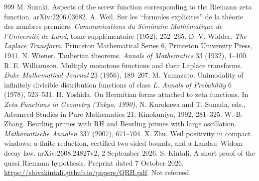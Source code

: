 \begin{thebibliography}{999}
 M. Suzuki. Aspects of the screw function corresponding to the Riemann zeta function. arXiv:2206.03682.
 A. Weil. Sur les ``formules explicites'' de la th\'eorie des nombres premiers. \emph{Communications du S\'eminaire Math\'ematique de l'Universit\'e de Lund}, tome suppl\'ementaire (1952), 252--265.
 D. V. Widder. \emph{The Laplace Transform}. Princeton Mathematical Series 6, Princeton University Press, 1941.
 N. Wiener. Tauberian theorems. \emph{Annals of Mathematics} 33 (1932), 1--100.
 R. E. Williamson. Multiply monotone functions and their Laplace transforms. \emph{Duke Mathematical Journal} 23 (1956), 189--207.
 M. Yamazato. Unimodality of infinitely divisible distribution functions of class $L$. \emph{Annals of Probability} 6 (1978), 523--531.
 H. Yoshida. On Hermitian forms attached to zeta functions. In \emph{Zeta Functions in Geometry (Tokyo, 1990)}, N. Kurokawa and T. Sunada, eds., Advanced Studies in Pure Mathematics 21, Kinokuniya, 1992, 281--325.
 W.-B. Zhang. Beurling primes with RH and Beurling primes with large oscillation. \emph{Mathematische Annalen} 337 (2007), 671--704.
 X. Zhu. Weil positivity in compact windows: a finite reduction, certified two-sided bounds, and a Landau--Widom decay law. arXiv:2608.24827v2, 2 September 2026.
 S. Kintali. A short proof of the quasi Riemann hypothesis. Preprint dated 7 October 2026, \url{https://shivakintali.github.io/papers/QRH.pdf}. Not refereed. %

\end{thebibliography}
